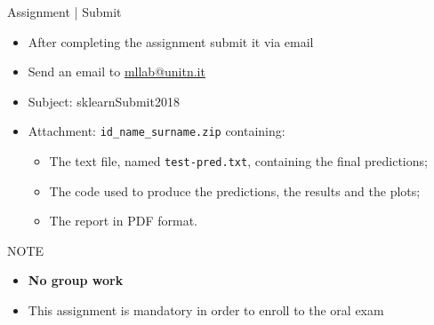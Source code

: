 \documentclass{beamer}
\begin{document}
\begin{frame}{Assignment | Submit}

\begin{itemize}
    \item After completing the assignment submit it via email
    \item Send an email to \href{mailto:mllab@unitn.it}{mllab@unitn.it} 
    \item Subject: sklearnSubmit2018
    \item Attachment: \texttt{id\_name\_surname.zip} containing:
    \begin{itemize}
	    \item The text file, named \texttt{test-pred.txt},  containing the final predictions;
        \item The code used to produce the predictions, the results and the plots;
        \item The report in PDF format.
    \end{itemize}
\end{itemize}
\begin{alertblock}{NOTE}
    \begin{itemize}
	\item \textbf{No group work}
        \item This assignment is mandatory in order to enroll to the oral exam
    \end{itemize}
\end{alertblock}

\end{frame}
\end{document}
